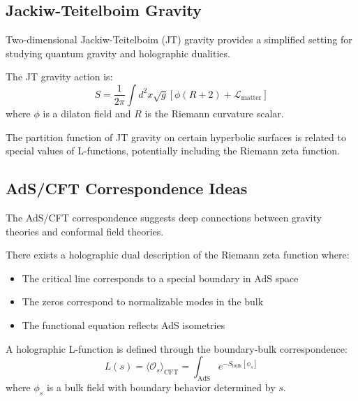 \subsection{Jackiw-Teitelboim Gravity}

Two-dimensional Jackiw-Teitelboim (JT) gravity provides a simplified setting for studying quantum gravity and holographic dualities.

\begin{definition}
\label{def:jt_action}
The JT gravity action is:
\begin{equation}
S = \frac{1}{2\pi} \int d^2x \sqrt{g} \left[ \phi (R + 2) + \mathcal{L}_{\text{matter}} \right]
\label{eq:jt_action}
\end{equation}
where $\phi$ is a dilaton field and $R$ is the Riemann curvature scalar.
\end{definition}

\begin{conjecture}
\label{conj:jt_zeta}
The partition function of JT gravity on certain hyperbolic surfaces is related to special values of L-functions, potentially including the Riemann zeta function.
\end{conjecture}

\subsection{AdS/CFT Correspondence Ideas}

The AdS/CFT correspondence suggests deep connections between gravity theories and conformal field theories.

\begin{hypothesis}
\label{hyp:ads_cft_rh}
There exists a holographic dual description of the Riemann zeta function where:
\begin{itemize}
\item The critical line corresponds to a special boundary in AdS space
\item The zeros correspond to normalizable modes in the bulk
\item The functional equation reflects AdS isometries
\end{itemize}
\end{hypothesis}

\begin{definition}
\label{def:holographic_l_function}
A holographic L-function is defined through the boundary-bulk correspondence:
\begin{equation}
L(s) = \langle \mathcal{O}_s \rangle_{\text{CFT}} = \int_{\text{AdS}} e^{-S_{\text{bulk}}[\phi_s]}
\label{eq:holographic_l_function}
\end{equation}
where $\phi_s$ is a bulk field with boundary behavior determined by $s$.
\end{definition}

